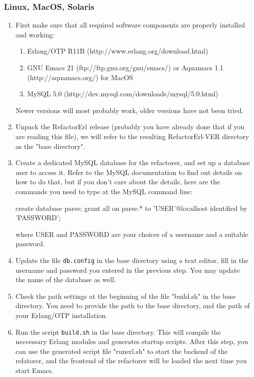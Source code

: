 \documentclass[12pt]{article}
\begin{document}
\subsubsection{Linux, MacOS, Solaris}
\begin{enumerate}
	\item First make  sure that  all  required software  components are  properly
installed and working:
\begin{enumerate}
	\item Erlang/OTP R11B (http://www.erlang.org/download.html)
  	\item GNU Emacs 21    (ftp://ftp.gnu.org/gnu/emacs/) or Aquamacs 1.1    (http://aquamacs.org/) for MacOS
  	\item MySQL 5.0       (http://dev.mysql.com/downloads/mysql/5.0.html)

\end{enumerate}

Newer versions will most probably work, older versions have not been tried.

\item Unpack the  RefactorErl release (probably you have  already done that if
you are reading this file),  we will refer to the resulting RefactorErl-VER
directory as the "base directory".
  
\item  Create a  dedicated MySQL  database for  the refactorer,  and set  up a
database user  to access it. Refer  to the MySQL documentation  to find out
details on how  to do that, but  if you don't care about  the details, here
are the commands you need to type at the MySQL command line:

  create database parse;
  grant all on parse.* to 'USER'@localhost identified by 'PASSWORD';

where  USER and  PASSWORD are  your choices  of a  username and  a suitable
password.

\item Update the  file {\tt db.config} in the base directory  using a text editor,
fill in the username and password you entered in the previous step. You may
update the name of the database as well.

\item Check the  path settings at the beginning of the  file "build.sh" in the
base directory. You need to provide the path to the base directory, and the
path of your Erlang/OTP installation.

\item Run the  script {\tt build.sh} in the base directory.  This will compile the
neccessary Erlang  modules and generates startup scripts.  After this step,
you can use  the generated script file "runerl.sh" to  start the backend of
the refatorer, and  the frontend of the refactorer will  be loaded the next
time you start Emacs.


\end{enumerate}
\end{document}
